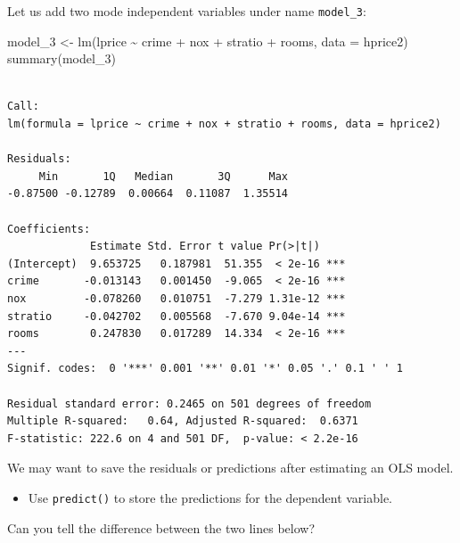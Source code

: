 \documentclass[
  letterpaper,
  DIV=11,
  numbers=noendperiod]{scrreprt}
\newenvironment{Shaded}{\begin{snugshade}}{\end{snugshade}}
\newcommand{\AttributeTok}[1]{\textcolor[rgb]{0.40,0.45,0.13}{#1}}
\newcommand{\FunctionTok}[1]{\textcolor[rgb]{0.28,0.35,0.67}{#1}}
\newcommand{\NormalTok}[1]{\textcolor[rgb]{0.00,0.23,0.31}{#1}}
\newcommand{\OtherTok}[1]{\textcolor[rgb]{0.00,0.23,0.31}{#1}}
\newcommand{\SpecialCharTok}[1]{\textcolor[rgb]{0.37,0.37,0.37}{#1}}
\providecommand{\tightlist}{%
  \setlength{\itemsep}{0pt}\setlength{\parskip}{0pt}}\usepackage{longtable,booktabs,array}
\begin{document}
Let us add two mode independent variables under name \texttt{model\_3}:

\begin{Shaded}
\begin{Highlighting}[]
\NormalTok{model\_3 }\OtherTok{\textless{}{-}} \FunctionTok{lm}\NormalTok{(lprice }\SpecialCharTok{\textasciitilde{}}\NormalTok{ crime }\SpecialCharTok{+}\NormalTok{ nox }\SpecialCharTok{+}\NormalTok{ stratio }\SpecialCharTok{+}\NormalTok{ rooms, }
              \AttributeTok{data =}\NormalTok{ hprice2)}
\FunctionTok{summary}\NormalTok{(model\_3)}
\end{Highlighting}
\end{Shaded}

\begin{verbatim}

Call:
lm(formula = lprice ~ crime + nox + stratio + rooms, data = hprice2)

Residuals:
     Min       1Q   Median       3Q      Max 
-0.87500 -0.12789  0.00664  0.11087  1.35514 

Coefficients:
             Estimate Std. Error t value Pr(>|t|)    
(Intercept)  9.653725   0.187981  51.355  < 2e-16 ***
crime       -0.013143   0.001450  -9.065  < 2e-16 ***
nox         -0.078260   0.010751  -7.279 1.31e-12 ***
stratio     -0.042702   0.005568  -7.670 9.04e-14 ***
rooms        0.247830   0.017289  14.334  < 2e-16 ***
---
Signif. codes:  0 '***' 0.001 '**' 0.01 '*' 0.05 '.' 0.1 ' ' 1

Residual standard error: 0.2465 on 501 degrees of freedom
Multiple R-squared:   0.64, Adjusted R-squared:  0.6371 
F-statistic: 222.6 on 4 and 501 DF,  p-value: < 2.2e-16
\end{verbatim}

We may want to save the residuals or predictions after estimating an OLS
model.

\begin{itemize}
\tightlist
\item
  Use \texttt{predict()} to store the predictions for the dependent
  variable.
\end{itemize}

Can you tell the difference between the two lines below?

\begin{Shaded}
\end{Shaded}
\end{document}

